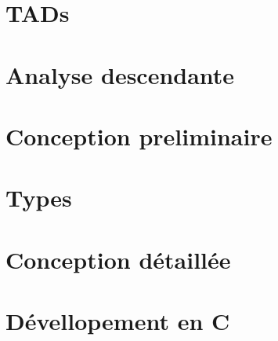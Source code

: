 


  

  \newpage
  \tableofcontents

  \newpage
  \section{TADs}
    

  \newpage
  \section{Analyse descendante}
    

  \newpage
  \section{Conception preliminaire}
    
    
    

  \newpage
  \section{Types}
    

  \newpage
  \section{Conception détaillée}
    
    
    
    
    
    
    
    
    

  \newpage
  \section{Dévellopement en C}
    

